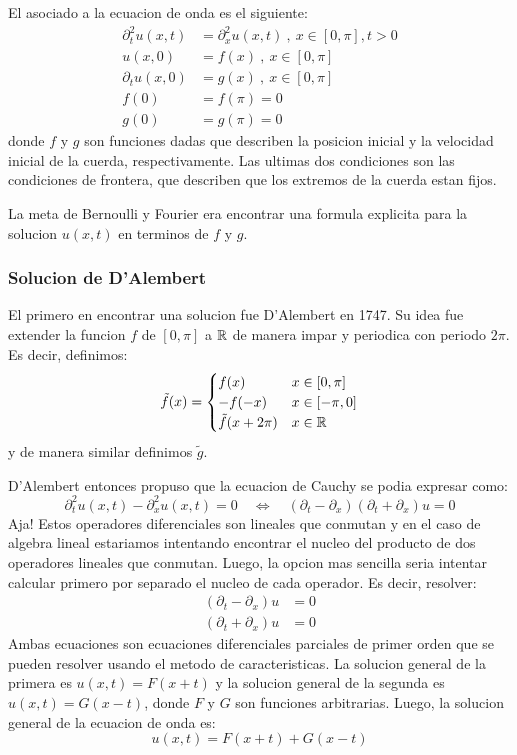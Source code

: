 El  asociado a la ecuacion de onda es el siguiente:
\begin{align*}
   \partial^2_t u(x,t) &=  \partial^2_x u(x,t) \ , \ x \in [0,\pi], t > 0 \\
   u(x,0) &= f(x) \ , \ x \in [0,\pi] \\
   \partial_t u(x,0) &= g(x) \ , \ x \in [0,\pi] \\
   f(0)&= f(\pi) = 0 \\
   g(0)&= g(\pi) = 0
\end{align*}
donde $f$ y $g$ son funciones dadas que describen la posicion inicial y la velocidad inicial de la cuerda, respectivamente. Las ultimas dos condiciones son las condiciones de frontera, que describen que los extremos de la cuerda estan fijos.

La meta de Bernoulli y Fourier era encontrar una formula explicita para la solucion $u(x,t)$ en terminos de $f$ y $g$.

\subsubsection*{Solucion de D'Alembert}

El primero en encontrar una solucion fue D'Alembert en 1747. Su idea fue extender la funcion $f$ de $[0,\pi]$ a $\mathbb R$ de manera impar y periodica con periodo $2\pi$. Es decir, definimos:
\[
   \tilde{f}(x) = \begin{cases}
      f(x) & x \in [0,\pi] \\
      -f(-x) & x \in [-\pi,0] \\
      \tilde{f}(x+2\pi) & x \in \mathbb R
   \end{cases} 
\]
y de manera similar definimos $\tilde{g}$. 

D'Alembert entonces propuso que la ecuacion de Cauchy se podia expresar como:
\[
   \partial^2_t u(x,t) -  \partial^2_x u(x,t)=0 \quad \iff \quad (\partial_t-\partial_x)(\partial_t+\partial_x)u = 0
\]
Aja! Estos operadores diferenciales son lineales que conmutan y en el caso de algebra lineal estariamos intentando encontrar el nucleo del producto de dos operadores lineales que conmutan. Luego, la opcion mas sencilla seria intentar calcular primero por separado el nucleo de cada operador. Es decir, resolver:
\begin{align*}
   (\partial_t-\partial_x)u &= 0 \\
   (\partial_t+\partial_x)u &= 0
\end{align*}
Ambas ecuaciones son ecuaciones diferenciales parciales de primer orden que se pueden resolver usando el metodo de caracteristicas. La solucion general de la primera es $u(x,t) = F(x+t)$ y la solucion general de la segunda es $u(x,t) = G(x-t)$, donde $F$ y $G$ son funciones arbitrarias. Luego, la solucion general de la ecuacion de onda es:
\[
   u(x,t) = F(x+t) + G(x-t)
\]


